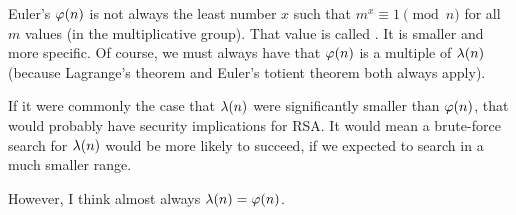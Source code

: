 \begin{remark}
  Euler's $\varphi\mathopen{}\left( {n} \right)\mathclose{}$ is not always the least number $x$ such that $m^x
  \equiv 1 \pmod{n}$ for all $m$ values (in the multiplicative group).
  That value is called . It is
  smaller and more specific. Of course, we must always have that
  $\varphi\mathopen{}\left( {n} \right)\mathclose{}$ is a multiple of $\lambda\mathopen{}\left( {n} \right)\mathclose{}$ (because Lagrange's theorem
  and Euler's totient theorem both always apply).

  If it were commonly the case that $\lambda\mathopen{}\left( {n} \right)\mathclose{}$ were significantly
  smaller than $\varphi\mathopen{}\left( {n} \right)\mathclose{}$, that would probably have security
  implications for RSA. It would mean a brute-force search for
  $\lambda\mathopen{}\left( {n} \right)\mathclose{}$ would be more likely to succeed, if we expected to
  search in a much smaller range.

  However, I think almost always $\lambda\mathopen{}\left( {n} \right)\mathclose{} = \varphi\mathopen{}\left( {n} \right)\mathclose{}$.
\end{remark}

